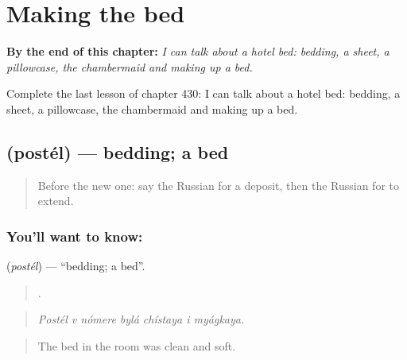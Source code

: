 
\chapter{Making the bed}
\label{ch:ru-making-the-bed}

\begin{chapteropening}
\textbf{By the end of this chapter:} \emph{I can talk about a hotel bed: bedding, a sheet, a pillowcase, the chambermaid and making up a bed.}

Complete the last lesson of chapter 430: I can talk about a hotel bed: bedding, a sheet, a pillowcase, the chambermaid and making up a bed.
\end{chapteropening}

\section[\texorpdfstring{\ru{постель} (postél)}{постель (postél)}]{ (postél) — bedding; a bed}

\label{lesson:RU-C430-postel}



\begin{quote}
Before the new one: say the Russian for a deposit, then the Russian for to extend.
\end{quote}

\subsection*{You'll want to know: }
\textbf{} (\emph{postél}) — \textquotedblleft{}bedding; a bed\textquotedblright{}.

\begin{quote}
      .
\end{quote}

\begin{quote}
\emph{Postél v nómere bylá chístaya i myágkaya.}
\end{quote}

\begin{quote}
The bed in the room was clean and soft.
\end{quote}

